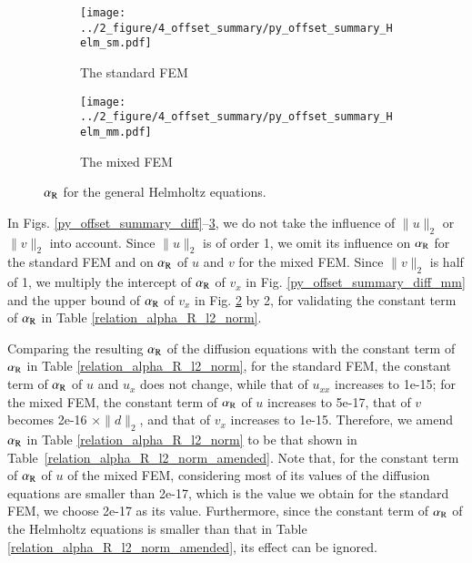 \documentclass[review,3p]{elsarticle}
\begin{document}
\begin{figure}[!ht]
	\centering
    \begin{subfigure}{6.0cm}
        \texttt{[image: ../2\_figure/4\_offset\_summary/py\_offset\_summary\_Helm\_sm.pdf]}
        \caption{The standard FEM}
        \label{py_offset_summary_Helm_sm}
    \end{subfigure}
    \hspace{-0.2cm}
    \begin{subfigure}{6.0cm}
        \texttt{[image: ../2\_figure/4\_offset\_summary/py\_offset\_summary\_Helm\_mm.pdf]}
        \caption{The mixed FEM}
        \label{py_offset_summary_Helm_mm}
    \end{subfigure}
\caption{$\alpha_{\rm R}$ for the general Helmholtz equations.}
\label{py_offset_summary_Helm}
\end{figure}

In Figs. \ref{py_offset_summary_diff}--\ref{py_offset_summary_Helm}, we do not take the influence of $\|u\|_2$ or$\|v\|_2$ into account. Since $\|u\|_2$ is of order 1, we omit its influence on $\alpha_{\rm R}$ for the standard FEM and on $\alpha_{\rm R}$ of $u$ and $v$ for the mixed FEM. Since $\|v\|_2$ is half of 1, we multiply the intercept of $\alpha_{\rm R}$ of $v_x$ in Fig. \ref{py_offset_summary_diff_mm} and the upper bound of $\alpha_{\rm R}$ of $v_x$ in Fig. \ref{py_offset_summary_Helm_mm} by 2, for validating the constant term of $\alpha_{\rm R}$ in Table \ref{relation_alpha_R_l2_norm}.

Comparing the resulting $\alpha_{\rm R}$ of the diffusion equations with the constant term of $\alpha_{\rm R}$ in Table \ref{relation_alpha_R_l2_norm}, for the standard FEM, the constant term of $\alpha_{\rm R}$ of $u$ and $u_x$ does not change, while that of $u_{xx}$ increases to 1e-15; for the mixed FEM, the constant term of $\alpha_{\rm R}$ of $u$ increases to 5e-17, that of $v$ becomes 2e-16 $\times \|d\|_2$, and that of $v_x$ increases to 1e-15. Therefore, we amend $\alpha_{\rm R}$ in Table \ref{relation_alpha_R_l2_norm} to be that shown in Table~\ref{relation_alpha_R_l2_norm_amended}. Note that, for the constant term of $\alpha_{\rm R}$ of $u$ of the mixed FEM, considering most of its values of the diffusion equations are smaller than 2e-17, which is the value we obtain for the standard FEM, we choose 2e-17 as its value. Furthermore, since the constant term of $\alpha_{\rm R}$ of the Helmholtz equations is smaller than that in Table \ref{relation_alpha_R_l2_norm_amended}, its effect can be ignored.
\end{document}
